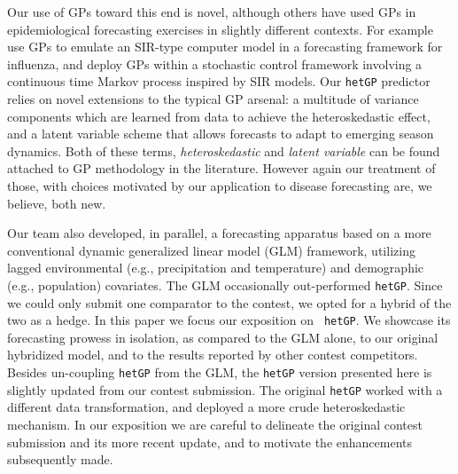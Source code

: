 \documentclass[12pt]{article}
\begin{document}
Our use of GPs toward this end is novel, although others have used GPs in
epidemiological forecasting exercises in slightly different contexts.  For
example \citet{farah:etal:2014} use GPs to emulate an SIR-type computer model
in a forecasting framework for influenza, and \citet{hu2015sequential} deploy
GPs within a stochastic control framework involving a continuous time Markov
process inspired by SIR models.  Our {\tt hetGP} predictor relies on novel
extensions to the typical GP arsenal: a multitude of variance components which
are learned from data to achieve the heteroskedastic effect, and a latent
variable scheme that allows forecasts to adapt to emerging season dynamics.
Both of these terms, {\em heteroskedastic} \citep[e.g.,][]{binois:etal:2016}
and {\em latent variable} \citep[e.g.,][]{bornn:shaddick:zidek:2012} can be
found attached to GP methodology in the literature.  However again our
treatment of those, with choices motivated by our application to disease
forecasting are, we believe, both new.


Our team also developed, in parallel, a forecasting apparatus based on a more
conventional dynamic generalized linear model (GLM) framework, utilizing
lagged environmental (e.g., precipitation and temperature) and demographic
(e.g., population) covariates.  The GLM occasionally out-performed {\tt hetGP}.
Since we could only submit one comparator to the contest, we opted for a
hybrid of the two as a hedge. In this paper we focus our exposition on {\tt
hetGP}.  We showcase its forecasting prowess in isolation, as compared to the
GLM alone, to our original hybridized model, and to the results reported by
other contest competitors. Besides un-coupling {\tt hetGP} from the GLM, the
{\tt hetGP} version presented here is slightly updated from our contest
submission.  The original {\tt hetGP} worked with a different data
transformation, and deployed a more crude heteroskedastic mechanism.  In our
exposition we are careful to delineate the original contest submission and its
more recent update, and to motivate the enhancements subsequently made.
\end{document}
